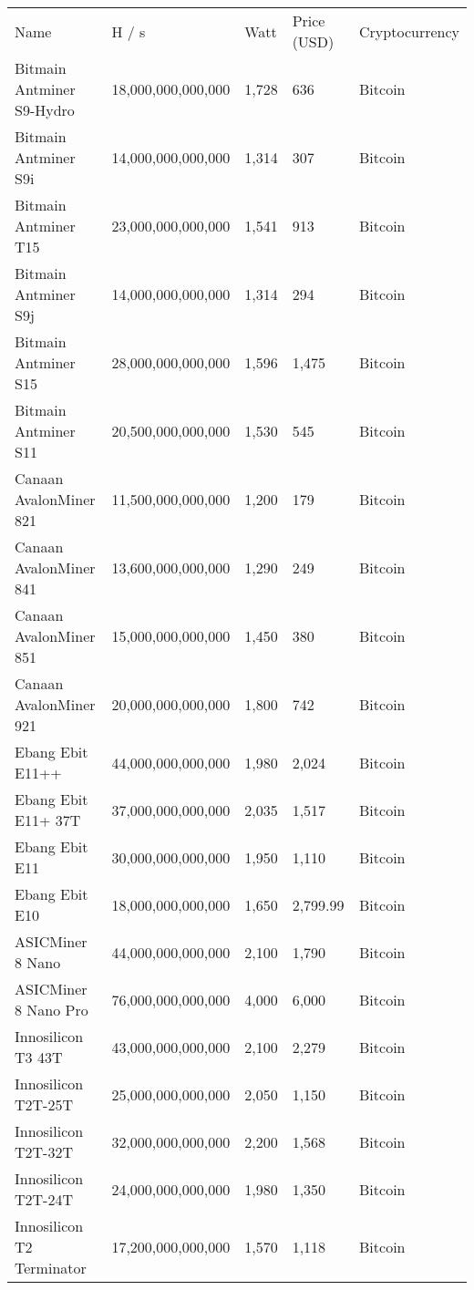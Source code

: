 \begin{longtable}{|p{}|p{}|p{}|p{}|p{}|}
    \hline
    Name & H / s & Watt & Price (USD) & Cryptocurrency\\
    \hhline{|=|=|=|=|=|}
  \hline
  Bitmain Antminer S9-Hydro & 18,000,000,000,000 & 1,728 & 636 & Bitcoin \\
  Bitmain Antminer S9i & 14,000,000,000,000 & 1,314 & 307 & Bitcoin \\
  Bitmain Antminer T15 & 23,000,000,000,000 & 1,541 & 913 & Bitcoin \\
  Bitmain Antminer S9j & 14,000,000,000,000 & 1,314 & 294 & Bitcoin \\
  Bitmain Antminer S15 & 28,000,000,000,000 & 1,596 & 1,475 & Bitcoin \\
  Bitmain Antminer S11 & 20,500,000,000,000 & 1,530 & 545 & Bitcoin \\
  Canaan AvalonMiner 821 & 11,500,000,000,000 & 1,200 & 179 & Bitcoin \\
  Canaan AvalonMiner 841 & 13,600,000,000,000 & 1,290 & 249 & Bitcoin \\
  Canaan AvalonMiner 851 & 15,000,000,000,000 & 1,450 & 380 & Bitcoin \\
  Canaan AvalonMiner 921 & 20,000,000,000,000 & 1,800 & 742 & Bitcoin \\
  Ebang Ebit E11++ & 44,000,000,000,000 & 1,980 & 2,024 & Bitcoin \\
  Ebang Ebit E11+ 37T & 37,000,000,000,000 & 2,035 & 1,517 & Bitcoin \\
  Ebang Ebit E11 & 30,000,000,000,000 & 1,950 & 1,110 & Bitcoin \\
  Ebang Ebit E10 & 18,000,000,000,000 & 1,650 & 2,799.99 & Bitcoin \\
  ASICMiner 8 Nano & 44,000,000,000,000 & 2,100 & 1,790 & Bitcoin \\
  ASICMiner 8 Nano Pro & 76,000,000,000,000 & 4,000 & 6,000 & Bitcoin \\
  Innosilicon T3 43T & 43,000,000,000,000 & 2,100 & 2,279 & Bitcoin \\
  Innosilicon T2T-25T & 25,000,000,000,000 & 2,050 & 1,150 & Bitcoin \\
  Innosilicon T2T-32T & 32,000,000,000,000 & 2,200 & 1,568 & Bitcoin \\
  Innosilicon T2T-24T & 24,000,000,000,000 & 1,980 & 1,350 & Bitcoin \\
  Innosilicon T2 Terminator & 17,200,000,000,000 & 1,570 & 1,118 & Bitcoin \\

\end{longtable}
